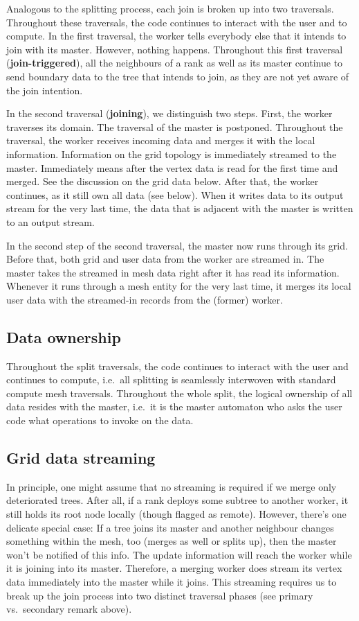 Analogous to the splitting process, each join is broken up into two traversals.
Throughout these traversals, the code continues to interact with the user and to
compute.
In the first traversal, the worker tells everybody else that it intends to join
with its master. 
However, nothing happens.
Throughout this first traversal ({\bf join-triggered}), all the neighbours of a
rank as well as its master continue to send boundary data to the tree that
intends to join, as they are not yet aware of the join intention.

In the second traversal ({\bf joining}), we distinguish two steps.
First, the worker traverses its domain.
The traversal of the master is postponed. 
Throughout the traversal, the worker receives incoming data and merges it with
the local information.
Information on the grid topology is immediately streamed to the master.
Immediately means after the vertex data is read for the first time and merged.
See the discussion on the grid data below.
After that, the worker continues, as it still own all data (see below).
When it writes data to its output stream for the very last time, the data that
is adjacent with the master is written to an output stream.


In the second step of the second traversal, the master now runs through its
grid.
Before that, both grid and user data from the worker are streamed in.
The master takes the streamed in mesh data right after it has read its
information.
Whenever it runs through a mesh entity for the very last time, it merges its
local user data with the streamed-in records from the (former) worker.
 


\subsection{Data ownership}

Throughout the split traversals, the code continues to interact with the user
and continues to compute, i.e.~all splitting is seamlessly interwoven with
standard compute mesh traversals.
Throughout the whole split, the logical ownership of all data resides with the
master, i.e.~it is the master automaton who asks the user code what operations to invoke
on the data. 


\subsection{Grid data streaming}


In principle, one might assume that no streaming is required if we merge only
deteriorated trees. 
After all, if a rank deploys some subtree to another worker, it still holds its
root node locally (though flagged as remote).
However, there's one delicate special case:
If a tree joins its master and another neighbour changes something within the
mesh, too (merges as well or splits up), then the master won't be notified of
this info.
The update information will reach the worker while it is joining into its
master.
Therefore, a merging worker does stream its vertex data immediately into the
master while it joins.
This streaming requires us to break up the join process into two distinct
traversal phases (see primary vs.~secondary remark above).



